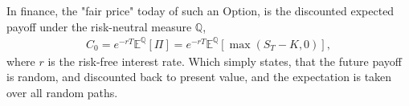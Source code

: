 In finance, the "fair price" today of such an Option, is the discounted expected payoff under the risk-neutral measure $\mathbb{Q}$,
\begin{align} \label{eq:bs_price}
    C_0 = e^{-rT} \mathbb{E}^{\mathbb{Q}}[\Pi] = e^{-rT} \mathbb{E}^{\mathbb{Q}}[\max(S_T - K, 0)],
\end{align}
where $r$ is the risk-free interest rate. Which simply states, that the future payoff is random, and discounted back to present value, and the expectation is taken over all random paths.  